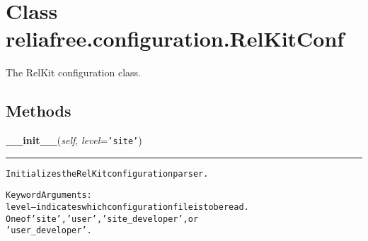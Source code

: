 %
%
%


\section{Class reliafree.configuration.RelKitConf}

    \label{reliafree:configuration:RelKitConf}
The RelKit configuration class.



  \subsection{Methods}

    \label{reliafree:configuration:RelKitConf:__init__}

    \vspace{0.5ex}

\hspace{.8\funcindent}\begin{boxedminipage}{\funcwidth}

    \raggedright \textbf{\_\_init\_\_}(\textit{self}, \textit{level}={\tt \texttt{'}\texttt{site}\texttt{'}})

    \vspace{-1.5ex}

    \rule{\textwidth}{0.5\fboxrule}
\setlength{\parskip}{2ex}
\begin{alltt}
Initializes the RelKit configuration parser.

Keyword Arguments:
level -- indicates which configuration file is to be read.
         One of 'site', 'user', 'site\_developer', or
         'user\_developer'.
\end{alltt}

\setlength{\parskip}{1ex}
    \end{boxedminipage}

